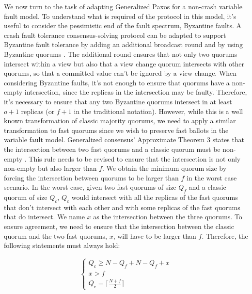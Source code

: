\documentclass[runningheads,a4paper]{llncs}
\begin{document}
We now turn to the task of adapting Generalized Paxos for a non-crash variable fault model. To understand what is required of the protocol in this model, it's useful to consider the pessimistic end of the fault spectrum, Byzantine faults. A crash fault tolerance consensus-solving protocol can be adapted to support Byzantine fault tolerance by adding an additional broadcast round and by using Byzantine quorums \cite{Cachin2009}. The additional round ensures that not only two quorums intersect within a view but also that a view change quorum intersects with other quorums, so that a committed value can't be ignored by a view change.
When considering Byzantine faults, it's not enough to ensure that quorums have a non-empty intersection, since the replicas in the intersection may be faulty. Therefore, it's necessary to ensure that any two Byzantine quorums intersect in at least $o+1$ replicas (or $f+1$ in the traditional notation). However, while this is a well known transformation of classic majority quorums, we need to apply a similar transformation to fast quorums since we wish to preserve fast ballots in the variable fault model. Generalized consensus' Approximate Theorem 3 states that the intersection between two fast quorums and a classic quorum must be non-empty \cite{Lamport2005}. This rule needs to be revised to ensure that the intersection is not only non-empty but also larger than $f$. We obtain the minimum quorum size by forcing the intersection between quorums to be larger than $f$ in the worst case scenario. In the worst case, given two fast quorums of size $Q_f$ and a classic quorum of size $Q_c$, $Q_c$ would intersect with all the replicas of the fast quorums that don't intersect with each other and with some replicas of the fast quorums that do intersect. We name $x$ as the intersection between the three quorums. To ensure agreement, we need to ensure that the intersection between the classic quorum and the two fast quorums, $x$, will have to be larger than $f$. Therefore, the following statements must always hold: \par

\begin{gather*}
	\begin{cases}
		Q_c \geq N - Q_f + N-Q_f + x \\
		x > f \\
		Q_c = \lceil \frac{N+f}{2}\rceil
	\end{cases} \\ 
\end{gather*}
\end{document}
